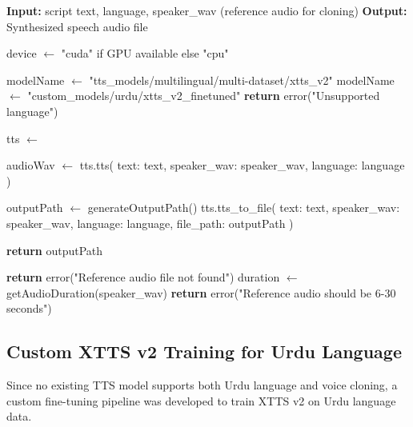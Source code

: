 \begin{algorithm}[H]
\caption{Voice Cloning and Speech Synthesis}
\begin{algorithmic}[1]
\State \textbf{Input:} script text, language, speaker\_wav (reference audio for cloning)
\State \textbf{Output:} Synthesized speech audio file

    \State device $\gets$ "cuda" if GPU available else "cpu"
    
        \State modelName $\gets$ "tts\_models/multilingual/multi-dataset/xtts\_v2"
        \State modelName $\gets$ "custom\_models/urdu/xtts\_v2\_finetuned"
    \Else
        \State \textbf{return} error("Unsupported language")
    \EndIf
    
    \State tts $\gets$ 
    
    \State {}
    
    \State audioWav $\gets$ tts.tts(
        \State \quad text: text,
        \State \quad speaker\_wav: speaker\_wav,
        \State \quad language: language
    \State )
    
    \State outputPath $\gets$ generateOutputPath()
    \State tts.tts\_to\_file(
        \State \quad text: text,
        \State \quad speaker\_wav: speaker\_wav,
        \State \quad language: language,
        \State \quad file\_path: outputPath
    \State )
    
    \State \textbf{return} outputPath
\EndProcedure

        \State \textbf{return} error("Reference audio file not found")
    \EndIf
    \State duration $\gets$ getAudioDuration(speaker\_wav)
        \State \textbf{return} error("Reference audio should be 6-30 seconds")
    \EndIf
\EndProcedure
\end{algorithmic}
\end{algorithm}

\subsection{Custom XTTS v2 Training for Urdu Language}

Since no existing TTS model supports both Urdu language and voice cloning, a custom fine-tuning pipeline was developed to train XTTS v2 on Urdu language data.

